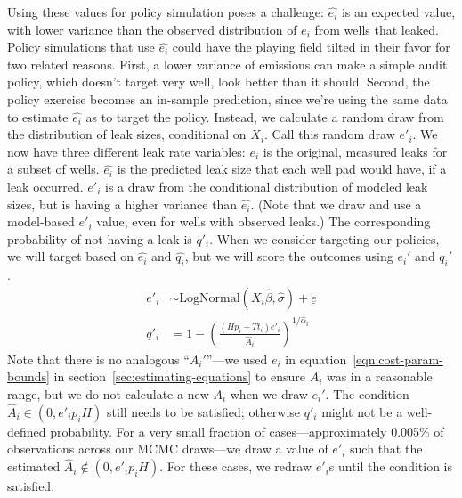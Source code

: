 \documentclass[12pt,oneside,letterpaper]{article}
\theoremstyle{definition}
\begin{document}
\begin{refsection}
Using these values for policy simulation poses a challenge:
\(\hat{e_i}\) is an expected value, with lower variance than the observed distribution of \(e_i\) from wells that leaked.
Policy simulations that use \(\hat{e_i}\) could have the playing field tilted in their favor for two related reasons.
First, a lower variance of emissions can make a simple audit policy, which doesn't target very well, look better than it should.
Second, the policy exercise becomes an in-sample prediction, since we're using the same data to estimate \(\hat{e_i}\) as to target the policy.
Instead, we calculate a random draw from the distribution of leak sizes, conditional on \(X_i\).
Call this random draw \(e'_i\).
We now have three different leak rate variables:
\(e_i\) is the original, measured leaks for a subset of wells.
\(\hat{e_i}\) is the predicted leak size that each well pad would have, if a leak occurred.
\(e'_i\) is a draw from the conditional distribution of modeled leak sizes, but is having a higher variance than \(\hat{e_i}\).
(Note that we draw and use a model-based \(e'_i\) value, even for wells with observed leaks.)
The corresponding probability of not having a leak is \(q'_i\).
When we consider targeting our policies, we will target based on \(\hat{e_i} \) and \(\hat{q_i}\), but we will score the outcomes using \(e_i'\) and \(q_i'\).
\begin{align*}
e'_i &\sim \text{LogNormal}(X_i \hat{\beta}, \hat{\sigma}) + \underline{e} \\
q'_i &= 1 - \left(\frac{(H p_i + T t_i) e'_i}{\hat{A}_i}\right) ^{1 / \hat{\alpha}_i}
\end{align*}
Note that there is no analogous ``\(A_i'\)''---we used \(e_i\) in equation~\ref{eqn:cost-param-bounds} in section~\ref{sec:estimating-equations} to ensure \(A_i\) was in a reasonable range, but we do not calculate a new \(A_i\) when we draw \(e_i'\).
The condition \(\hat{A}_i \in (0, e'_i p_i H)\) still needs to be satisfied; otherwise \(q'_i\) might not be a well-defined probability.
For a very small fraction of cases---approximately 0.005\% of observations across our \gls{MCMC} draws---we draw a value of \(e'_i\) such that the estimated \(\hat{A}_i \notin (0, e'_i p_i H)\).
For these cases, we redraw \(e'_i\)s until the condition is satisfied.



\end{refsection}
\end{document}
